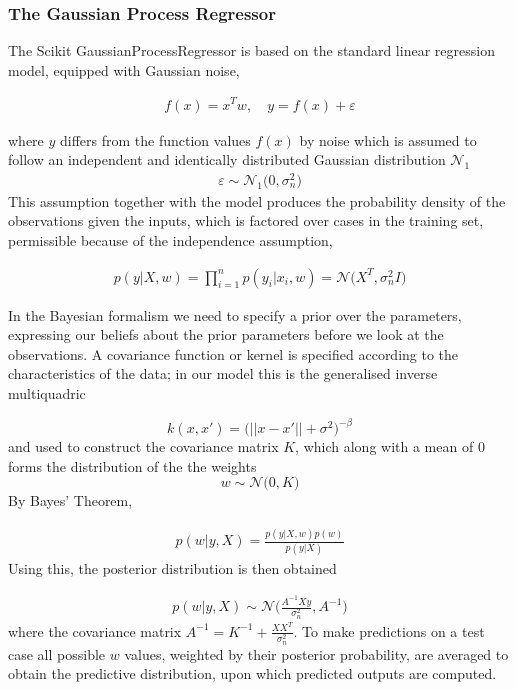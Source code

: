\documentclass[12pt,a4paper]{article}
\begin{document}
\subsubsection{The Gaussian Process Regressor}

The Scikit GaussianProcessRegressor is based on the 
standard linear regression 
model, equipped with Gaussian noise,

\begin{align} 
    f(x) = x^{T}w, \quad{y = f(x) + \varepsilon}
\end{align}

where $y$ differs from the function values $f(x)$ by noise which is assumed
to follow an independent and identically distributed Gaussian distribution
$\mathcal{N}_1$
\begin{align*}
    \varepsilon \sim \mathcal{N}_1 \bigl(0, \sigma_{n}^2\bigr)
\end{align*}
This assumption together with the model produces the 
probability density of the observations given the inputs, 
which is factored over cases in the training set, 
permissible because of the independence assumption,

\begin{align}
    p(y|X,w) = \prod_{i=1}^{n} p(y_i|x_i ,w) = \mathcal{N}\bigl(X^T, \sigma_{n}^2 I\bigr)
\end{align}

In the Bayesian formalism we need to specify a prior over the parameters, expressing our beliefs about the prior
parameters before we look at the observations. A covariance function or kernel
is specified according to the characteristics of the data; in our model this 
is the generalised inverse multiquadric

$$ k(x,x') = \biggl( ||x-x'|| + \sigma^2\biggr)^{-\beta} $$
and used to construct the covariance matrix $K$, which along with 
a mean of $0$ forms the distribution of the the weights 
$$ w \sim \mathcal{N}\bigl(0, K\bigr)$$
By Bayes' Theorem, 

\begin{align}
    p(w|y, X) = \frac{p(y|X,w) p(w)}{p(y|X)}
\end{align}
Using this, the posterior distribution is then obtained

\begin{align}
    p(w|y, X) \sim \mathcal{N}\bigl(\frac{A^{-1}Xy}{\sigma_{n}^{2}}, A^{-1}\bigr)
\end{align}
where the covariance matrix $A^{-1} = K^{-1} + \frac{XX^T}{\sigma_{n}^2}$.
To make predictions on a test case all possible $w$
values, weighted by their posterior probability, are averaged to obtain the
predictive distribution, upon which predicted outputs are computed.
\end{document}
